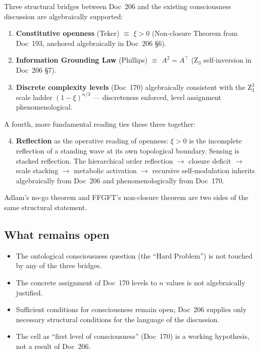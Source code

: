 \begin{conclusionBox}
Three structural bridges between Doc~206 and the existing consciousness discussion are algebraically supported:

\begin{enumerate}
\item \textbf{Constitutive openness} (Teker) $\equiv$ $\xi > 0$ (Non-closure Theorem from Doc~193, anchored algebraically in Doc~206 \S6).
\item \textbf{Information Grounding Law} (Phillips) $\equiv$ $A^2 = A^\top$ (Z$_3$ self-inversion in Doc~206 \S7).
\item \textbf{Discrete complexity levels} (Doc~170) algebraically consistent with the Z$_3^3$ scale ladder $(1-\xi)^{n/3}$ --- discreteness enforced, level assignment phenomenological.
\end{enumerate}

A fourth, more fundamental reading ties these three together:

\begin{enumerate}
\setcounter{enumi}{3}
\item \textbf{Reflection} as the operative reading of openness: $\xi > 0$ is the incomplete reflection of a standing wave at its own topological boundary. Sensing is stacked reflection. The hierarchical order reflection $\to$ closure deficit $\to$ scale stacking $\to$ metabolic activation $\to$ recursive self-modulation inherits algebraically from Doc~206 and phenomenologically from Doc~170.
\end{enumerate}

Adlam's no-go theorem and FFGFT's non-closure theorem are two sides of the same structural statement.
\end{conclusionBox}

\subsection{What remains open}

\begin{itemize}
\item The ontological consciousness question (the ``Hard Problem'') is not touched by any of the three bridges.
\item The concrete assignment of Doc~170 levels to $n$ values is not algebraically justified.
\item Sufficient conditions for consciousness remain open; Doc~206 supplies only necessary structural conditions for the language of the discussion.
\item The cell as ``first level of consciousness'' (Doc~170) is a working hypothesis, not a result of Doc~206.
\end{itemize}

